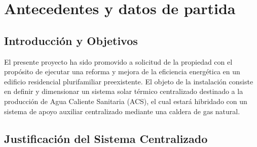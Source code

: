 \documentclass[12pt]{article}
\begin{document}

\hypersetup{linkcolor=black}
\tableofcontents\thispagestyle{empty}

{
	\let\oldnumberline\numberline	%
	\renewcommand{\numberline}{\figurename~\oldnumberline}
	\cleardoublepage						%
	\listoffigures\thispagestyle{empty}	%

}

{
	\let\oldnumberline\numberline	%
	\renewcommand{\numberline}{\tablename~\oldnumberline}
	\cleardoublepage		%
	\listoftables\thispagestyle{empty}	%
}


\hypersetup{
	linkcolor=blue,
	citecolor=blue,
	urlcolor=blue
}


\clearpage
{}
\section{Antecedentes y datos de partida}
\label{sec:introduccion}

\subsection{Introducción y Objetivos}
\label{subsec:origen_y_objeto}

El presente proyecto ha sido promovido a solicitud de la propiedad con el propósito de ejecutar una reforma y mejora de la eficiencia energética en un edificio residencial plurifamiliar preexistente. El objeto de la instalación consiste en definir y dimensionar un sistema solar térmico centralizado destinado a la producción de Agua Caliente Sanitaria (ACS), el cual estará hibridado con un sistema de apoyo auxiliar centralizado mediante una caldera de gas natural.

\subsection{Justificación del Sistema Centralizado}
\label{subsec:justificacion_centralizado}
\end{document}
